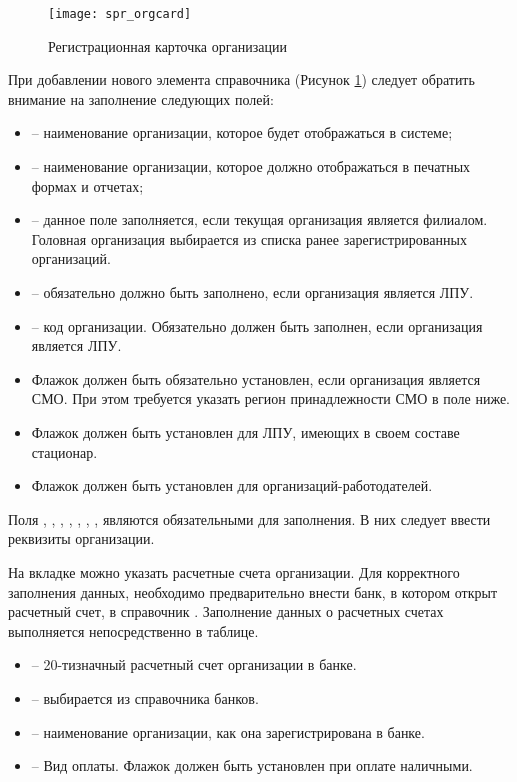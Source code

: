 \begin{figure}[ht]\centering
 \texttt{[image: spr\_orgcard]}
 \caption{Регистрационная карточка организации}
 \label{img_spr_orgcard}
\end{figure} 

При добавлении нового элемента справочника (Рисунок \ref{img_spr_orgcard}) следует обратить внимание на заполнение следующих полей:
\begin{itemize}
 \item {} – наименование организации, которое будет отображаться в системе;
 \item {} – наименование организации, которое должно отображаться в печатных формах и отчетах;
 \item {} – данное поле заполняется, если текущая организация является филиалом. Головная организация выбирается из списка ранее зарегистрированных организаций.
 \item {} – обязательно должно быть заполнено, если организация является ЛПУ.
 \item {} – код организации. Обязательно должен быть заполнен, если организация является ЛПУ.
 \item Флажок  должен быть обязательно установлен, если организация является СМО. При этом требуется указать регион принадлежности СМО в поле ниже.
 \item Флажок  должен быть установлен для ЛПУ, имеющих в своем составе стационар.
 \item Флажок  должен быть установлен для организаций-работодателей.
\end{itemize}

Поля , , , , , , ,  являются обязательными для заполнения. В них следует ввести реквизиты организации.

На вкладке  можно указать расчетные счета организации. Для корректного заполнения данных, необходимо предварительно внести банк, в котором открыт расчетный счет, в справочник . Заполнение данных о расчетных счетах выполняется непосредственно в таблице.
\begin{itemize}
 \item {} – 20-тизначный расчетный счет организации в банке.
 \item {} – выбирается из справочника банков.
 \item {} – наименование организации, как она зарегистрирована в банке.
 \item {} – Вид оплаты. Флажок должен быть установлен при оплате наличными.
\end{itemize}

